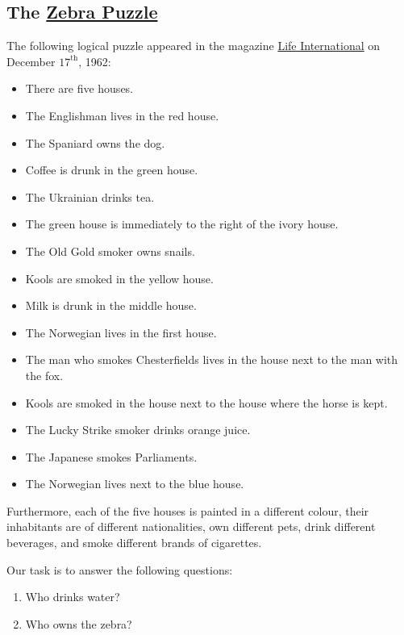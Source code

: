 \subsection{The \href{https://en.wikipedia.org/wiki/Zebra_Puzzle}{Zebra Puzzle} \label{section:zebra}} 
The following logical puzzle appeared in the magazine
\href{https://en.wikipedia.org/wiki/Life_(magazine)}{Life International} 
on December $17^\textrm{th}$, 1962:
\begin{itemize}
\item There are five houses.
\item The Englishman lives in the red house.
\item The Spaniard owns the dog.
\item Coffee is drunk in the green house.
\item The Ukrainian drinks tea.
\item The green house is immediately to the right of the ivory house.
\item The Old Gold smoker owns snails.
\item Kools are smoked in the yellow house.
\item Milk is drunk in the middle house.
\item The Norwegian lives in the first house.
\item The man who smokes Chesterfields lives in the house next to the man with the fox.
\item Kools are smoked in the house next to the house where the horse is kept.
\item The Lucky Strike smoker drinks orange juice.
\item The Japanese smokes Parliaments.
\item The Norwegian lives next to the blue house.
\end{itemize}
Furthermore, each of the five houses is painted in a different colour, their
inhabitants are of different nationalities, own different pets, drink different
beverages, and smoke different brands of cigarettes.  

Our task is to answer the following questions:
\begin{enumerate}
\item Who drinks water?
\item Who owns the zebra?
\end{enumerate}

